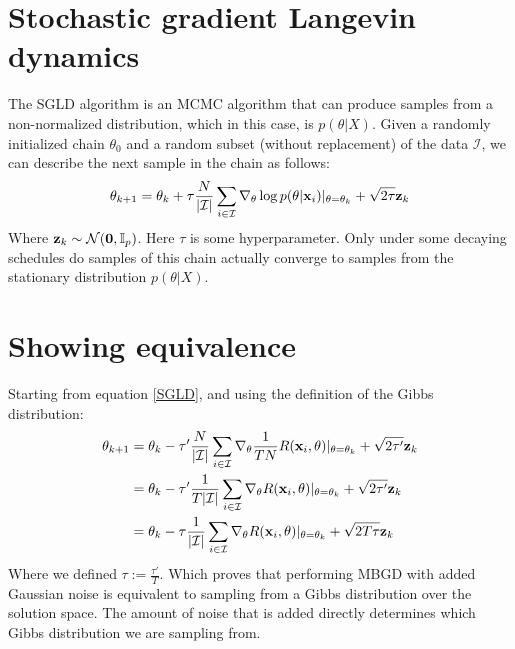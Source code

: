 \documentclass[twocolumn]{article}
\begin{document}
\section{Stochastic gradient Langevin dynamics}
The SGLD algorithm \cite{welling2011bayesian} is an MCMC algorithm that can produce samples from a non-normalized distribution, which in this case, is $p(\theta|X)$. Given a randomly initialized chain $\theta_0$ and a random subset (without replacement) of the data $\mathcal{I}$, we can describe the next sample in the chain as follows:
\begin{align}
  \theta_{k+1} = \theta_{k} + \tau \frac{N}{|\mathcal{I}|}\sum_{i \in \mathcal{I}} \nabla_{\theta}\log p(\theta|\bold{x}_i)|_{\theta = \theta_k} + \sqrt{2\tau}\bold{z}_k \label{SGLD}
\end{align}
Where $\bold{z}_k \sim \mathcal{N}(\bold{0}, \mathbb{I}_p)$. Here $\tau$ is some hyperparameter. Only under some decaying schedules do samples of this chain actually converge to samples from the stationary distribution $p(\theta|X)$.

\section{Showing equivalence}
Starting from equation \ref{SGLD}, and using the definition of the Gibbs distribution:
\begin{align*}
  \theta_{k+1} &= \theta_k - \tau' \frac{N}{|\mathcal{I}|}\sum_{i \in \mathcal{I}} \nabla_{\theta}\frac{1}{TN}R(\bold{x}_i, \theta)|_{\theta = \theta_k} + \sqrt{2\tau'}\bold{z}_k\\
          &= \theta_k - \tau' \frac{1}{T|\mathcal{I}|}\sum_{i \in \mathcal{I}} \nabla_{\theta}R(\bold{x}_i, \theta)|_{\theta = \theta_k} + \sqrt{2\tau'}\bold{z}_k\\
          &= \theta_k - \tau \frac{1}{|\mathcal{I}|}\sum_{i \in \mathcal{I}} \nabla_{\theta}R(\bold{x}_i, \theta)|_{\theta = \theta_k} + \sqrt{2T\tau}\bold{z}_k\\
\end{align*}
Where we defined $\tau := \frac{\tau'}{T}$. Which proves that performing MBGD with added Gaussian noise is equivalent to sampling from a Gibbs distribution over the solution space. The amount of noise that is added directly determines which Gibbs distribution we are sampling from.
\end{document}
